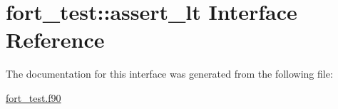 \hypertarget{interfacefort__test_1_1assert__lt}{}\section{fort\+\_\+test\+:\+:assert\+\_\+lt Interface Reference}
\label{interfacefort__test_1_1assert__lt}


The documentation for this interface was generated from the following file\+:\begin{DoxyCompactItemize}
\item 
\hyperlink{fort__test_8f90}{fort\+\_\+test.\+f90}\end{DoxyCompactItemize}
